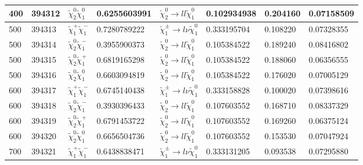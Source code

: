 \begin{table}[htb]
{{\begin{tabular}{llllllll}
                400             & 394312 & $\widetilde{\chi}^{0}_{2}\widetilde{\chi}^{0}_{1}$ & 0.6255603991       & $\widetilde{\chi}^{0}_{2} \rightarrow l l \widetilde{\chi}^{0}_{1}$     &  0.102934938 &  0.204160         &  0.07158509\\
                \hline
                500             & 394313 & $\widetilde{\chi}^{+}_{1}\widetilde{\chi}^{-}_{1}$ & 0.7280789222       & $\widetilde{\chi}^{\pm}_{1} \rightarrow l \nu \widetilde{\chi}^{0}_{1}$ &  0.333195704 &  0.108220         &  0.07328355\\
                500             & 394314 & $\widetilde{\chi}^{0}_{2}\widetilde{\chi}^{-}_{1}$ & 0.3955900373       & $\widetilde{\chi}^{0}_{2} \rightarrow l l \widetilde{\chi}^{0}_{1}$     &  0.105384522 &  0.189240         &  0.08416802\\
                500             & 394315 & $\widetilde{\chi}^{0}_{2}\widetilde{\chi}^{+}_{1}$ & 0.6819165298       & $\widetilde{\chi}^{0}_{2} \rightarrow l l \widetilde{\chi}^{0}_{1}$     &  0.105384522 &  0.188060         &  0.06356555\\
                500             & 394316 & $\widetilde{\chi}^{0}_{2}\widetilde{\chi}^{0}_{1}$ & 0.6603094819       & $\widetilde{\chi}^{0}_{2} \rightarrow l l \widetilde{\chi}^{0}_{1}$     &  0.105384522 &  0.176020         &  0.07005129\\
                \hline
                600             & 394317 & $\widetilde{\chi}^{+}_{1}\widetilde{\chi}^{-}_{1}$ & 0.6745140438       & $\widetilde{\chi}^{\pm}_{1} \rightarrow l \nu \widetilde{\chi}^{0}_{1}$ &  0.333158828 &  0.100020         &  0.07398616\\
                600             & 394318 & $\widetilde{\chi}^{0}_{2}\widetilde{\chi}^{-}_{1}$ & 0.3930396433       & $\widetilde{\chi}^{0}_{2} \rightarrow l l \widetilde{\chi}^{0}_{1}$     &  0.107603552 &  0.168710         &  0.08337329\\
                600             & 394319 & $\widetilde{\chi}^{0}_{2}\widetilde{\chi}^{+}_{1}$ & 0.6791453722       & $\widetilde{\chi}^{0}_{2} \rightarrow l l \widetilde{\chi}^{0}_{1}$     &  0.107603552 &  0.169260         &  0.06375124\\
                600             & 394320 & $\widetilde{\chi}^{0}_{2}\widetilde{\chi}^{0}_{1}$ & 0.6656504736       & $\widetilde{\chi}^{0}_{2} \rightarrow l l \widetilde{\chi}^{0}_{1}$     &  0.107603552 &  0.153530         &  0.07047924\\
                \hline
                700             & 394321 & $\widetilde{\chi}^{+}_{1}\widetilde{\chi}^{-}_{1}$ & 0.6438838471       & $\widetilde{\chi}^{\pm}_{1} \rightarrow l \nu \widetilde{\chi}^{0}_{1}$ &  0.333131205 &  0.093538         &  0.07295880\\

\end{tabular}}}
\end{table}
